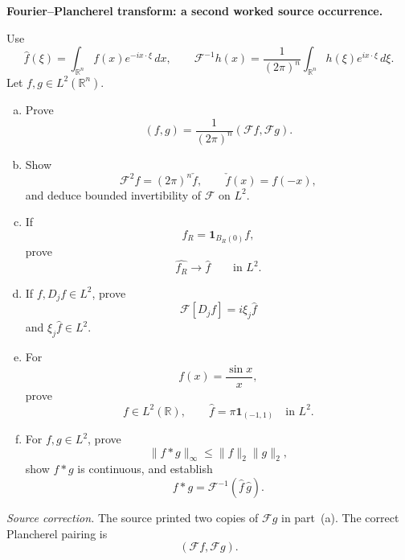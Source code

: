 \begin{problem}[CP-III-0005]
\label{prob:cp-iii-0005}
\textbf{Fourier--Plancherel transform: a second worked source occurrence.}

Use
\[
\widehat f(\xi)
=
\int_{\mathbb R^n}
f(x)e^{-ix\cdot\xi}\,dx,
\qquad
\mathcal F^{-1}h(x)
=
\frac1{(2\pi)^n}
\int_{\mathbb R^n}
h(\xi)e^{ix\cdot\xi}\,d\xi.
\]
Let \(f,g\in L^2(\mathbb R^n)\).

\begin{enumerate}[(a)]
\item Prove
\[
(f,g)
=
\frac1{(2\pi)^n}
(\mathcal Ff,\mathcal Fg).
\]

\item Show
\[
\mathcal F^2f
=
(2\pi)^n\check f,
\qquad
\check f(x)=f(-x),
\]
and deduce bounded invertibility of \(\mathcal F\) on \(L^2\).

\item If
\[
f_R=\mathbf1_{B_R(0)}f,
\]
prove
\[
\widehat{f_R}\to\widehat f
\qquad\text{in }L^2.
\]

\item If \(f,D_jf\in L^2\), prove
\[
\mathcal F[D_jf]
=
i\xi_j\widehat f
\]
and \(\xi_j\widehat f\in L^2\).

\item For
\[
f(x)=\frac{\sin x}{x},
\]
prove
\[
f\in L^2(\mathbb R),
\qquad
\widehat f
=
\pi\mathbf1_{(-1,1)}
\quad\text{in }L^2.
\]

\item For \(f,g\in L^2\), prove
\[
\|f*g\|_\infty
\le
\|f\|_2\|g\|_2,
\]
show \(f*g\) is continuous, and establish
\[
f*g
=
\mathcal F^{-1}(\widehat f\,\widehat g).
\]
\end{enumerate}

\medskip
\noindent
\textit{Source correction.}
The source printed two copies of \(\mathcal Fg\) in part~(a). The correct
Plancherel pairing is
\[
(\mathcal Ff,\mathcal Fg).
\]
\end{problem}

